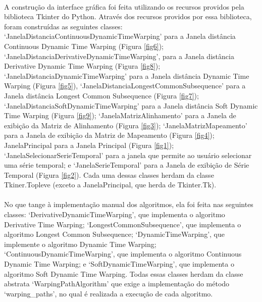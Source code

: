 \documentclass[12pt]{article}
\begin{document}
\paragraph{}A construção da interface gráfica foi feita utilizando os recursos providos pela biblioteca Tkinter do Python. Através dos recursos providos por essa biblioteca, foram construídas as seguintes classes: ‘JanelaDistanciaContinuousDynamicTimeWarping’ para a  Janela distância Continuous Dynamic Time Warping (Figura \ref{fig6}); ‘JanelaDistanciaDerivativeDynamicTimeWarping’, para a Janela distância Derivative Dynamic Time Warping (Figura \ref{fig8}); ‘JanelaDistanciaDynamicTimeWarping’ para a Janela distância Dynamic Time Warping (Figura \ref{fig5}), ‘JanelaDistanciaLongestCommonSubsequence’ para a Janela distância Longest Common Subsequence (Figura \ref{fig7}); ‘JanelaDistanciaSoftDynamicTimeWarping’ para a Janela distância Soft Dynamic Time Warping (Figura \ref{fig9}); ‘JanelaMatrizAlinhamento’ para a Janela de exibição da Matriz de Alinhamento (Figura \ref{fig3}); ‘JanelaMatrizMapeamento’ para a Janela de exibição da Matriz de Mapeamento (Figura \ref{fig4}); JanelaPrincipal para a Janela Principal (Figura \ref{fig1}); ‘JanelaSelecionarSerieTemporal’ para a janela que permite ao usuário selecionar uma série temporal; e ‘JanelaSerieTemporal’ para a Janela de exibição de Série Temporal (Figura \ref{fig2}). Cada uma dessas classes herdam da classe Tkiner.Topleve (exceto a JanelaPrincipal, que herda de Tkinter.Tk).

\paragraph{}No que tange à implementação manual dos algoritmos, ela foi feita nas seguintes classes: ‘DerivativeDynamicTimeWarping’, que implementa o algoritmo Derivative Time Warping; ‘LongestCommonSubsequence’, que implementa o algoritmo Longest Common Subsequence; ‘DynamicTimeWarping’, que implemente o algoritmo Dynamic Time Warping;
‘ContinuousDynamicTimeWarping’, que implementa o algoritmo Continuous Dynamic Time Warping;
e ‘SoftDynamicTimeWarping’, que implementa o algoritmo Soft Dynamic Time Warping. Todas essas classes herdam da classe abstrata ‘WarpingPathAlgorithm’ que exige a implementação do método ‘warping\_paths’, no qual é realizada a execução de cada algoritmo.
\end{document}
